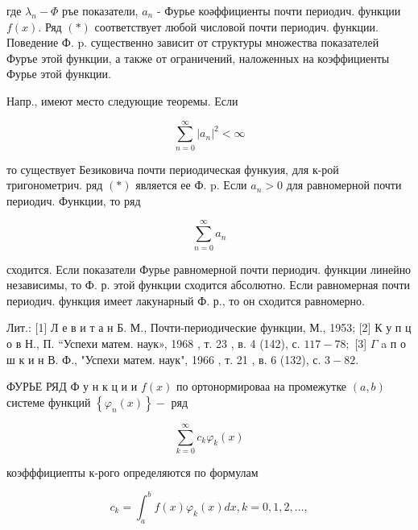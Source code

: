 \documentclass[10pt]{article}
\begin{document}
где $\lambda_{n}-\Phi$ ръе показатели, $a_{n}$ - Фурье коәффициенты почти периодич. функции $f(x)$. Ряд $(*)$ соответствует любой числовой почти периодич. функции. Поведение Ф. p. существенно зависит от структуры множества показателей Фуръе этой функции, а также от ограничений, наложенных на коэффициенты Фурье этой функции.



Напр., имеют место следующие теоремы. Если



\[

\sum_{n=0}^{\infty}\left|a_{n}\right|^{2}<\infty

\]



то существует Безиковича почти периодическая функуия, для к-рой тригонометрич. ряд $(*)$ является ее Ф. p. Если $a_{n}>0$ для равномерной почти периодич. Функции, то ряд



\[

\sum_{n=0}^{\infty} a_{n}

\]



сходится. Если показатели Фурье равномерной почти периодич. функции линейно независимы, то Ф. р. этой функции сходится абсолютно. Если равномерная почти периодич. функция имеет лакунарный Ф. р., то он сходится равномерно.



Лит.: [1] Л е в и т а н Б. М., Почти-периодические функции, М., 1953; [2] К у п ц о в Н., П. “Успехи матем. наук», 1968 , т. 23 , в. 4 (142), с. $117-78 ;$ [3] $\Gamma$ a п о ш к и н В. Ф., "Успехи матем. наук", 1966 , т. 21 , в. 6 (132), с. $3-82$.



ФУРЬЕ РЯД Ф у н к ц и и $f(x)$ по ортонормироваа на промежутке $(a, b)$ системе функций $\left\{\varphi_{n}(x)\right\}-$ ряд



\[

\sum_{k=0}^{\infty} c_{k} \varphi_{k}(x)

\]



коэфффициепты к-рого определяются по формулам



\[

c_{k}=\int_{a}^{b} f(x) \varphi_{k}(x) d x, k=0,1,2, \ldots,

\]
\end{document}
